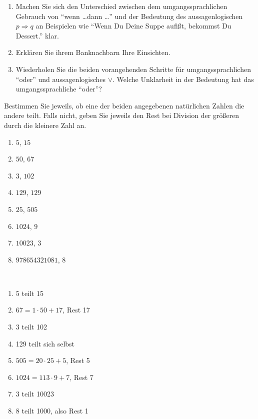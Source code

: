 \documentclass[12pt]{exam}
\begin{document}
\begin{questions}

\begin{enumerate}
	\item Machen Sie sich den Unterschied zwischen dem umgangssprachlichen Gebrauch von ``wenn \ldots dann \ldots'' und der Bedeutung des aussagenlogischen $p\Rightarrow q$ an Beispielen wie ``Wenn Du Deine Suppe aufißt, bekommst Du Dessert.'' klar.
	\item Erklären Sie ihrem Banknachbarn Ihre Einsichten.
	\item Wiederholen Sie die beiden vorangehenden Schritte für umgangssprachlichen ``oder'' und aussagenlogisches $\vee$. Welche Unklarheit in der Bedeutung hat das umgangssprachliche ``oder''?
\end{enumerate}



Bestimmen Sie jeweils, ob eine der beiden angegebenen natürlichen Zahlen die andere teilt. Falls nicht, geben Sie jeweils den Rest bei Division der größeren durch die kleinere Zahl an.\\
\parbox{0.5\textwidth}{\begin{enumerate}
		\item $5$, $15$    %
		\item $50$, $67$   %
		\item $3$, $102$   %
		\item $129$, $129$   %
\end{enumerate}}\parbox{0.5\textwidth}{\begin{enumerate}\setcounter{enumi}{4}
		\item $25$, $505$  %
		\item $1024$, $9$  %
		\item $10023$, $3$ %
		\item $978654321081$, $8$ %
\end{enumerate}}
\begin{solution}\\
	\parbox{0.5\textwidth}{\begin{enumerate}
			\item 5 teilt 15
			\item $67 = 1\cdot50 + 17$, Rest 17
			\item 3 teilt 102
			\item 129 teilt sich selbst
	\end{enumerate}}\parbox{0.5\textwidth}{\begin{enumerate}\setcounter{enumi}{4}
			\item $505 = 20\cdot25 + 5$, Rest 5
			\item $1024 = 113\cdot9 + 7$, Rest 7
			\item 3 teilt 10023
			\item 8 teilt 1000, also Rest 1
	\end{enumerate}}
\end{solution}




\end{questions}
\end{document}
